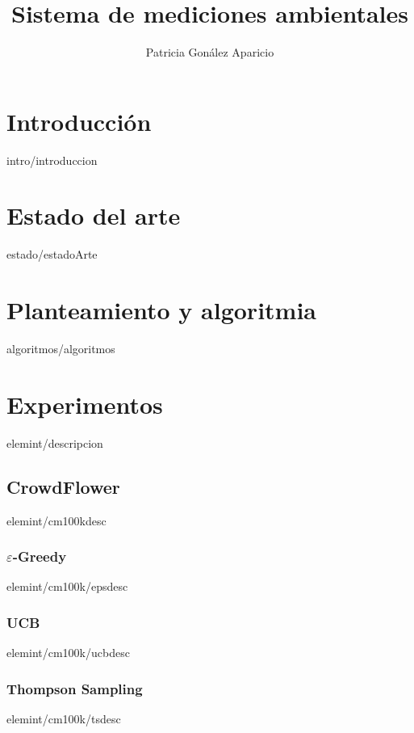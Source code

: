 \documentclass[epsbased,loall,copyright,final,printable,covers,extendedindex,firstnumbered,tfg,overleaf]{tfgtfmthesisuam}
\title{Sistema de mediciones ambientales}
\author{Patricia Gon\'alez Aparicio}
\begin{document}
\chapter{Introducci\'on\label{CAP:INTRO}}{intro/introduccion}

\chapter{Estado del arte\label{CAP:ESTADO}}{estado/estadoArte}

\chapter{Planteamiento y algoritmia\label{CAP:ALGORITMOS}}{algoritmos/algoritmos}

\chapter{Experimentos\label{CAP:EXPERIMENTOS}}{elemint/descripcion}
  \section{CrowdFlower\label{SEC:CM100K}}{elemint/cm100kdesc}
    \subsection{$\varepsilon$-Greedy\label{SS:EPSCM100K}}{elemint/cm100k/epsdesc}
    \subsection{UCB\label{SS:UCBCM100K}}{elemint/cm100k/ucbdesc}
    \subsection{Thompson Sampling\label{SS:TSCM100K}}{elemint/cm100k/tsdesc}
\end{document}
